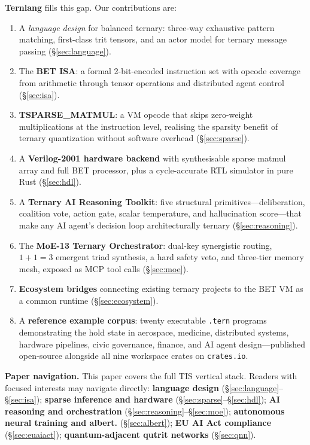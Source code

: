 \documentclass[11pt,a4paper]{article}
\begin{document}
\textbf{Ternlang} fills this gap. Our contributions are:

\begin{enumerate}
  \item A \emph{language design} for balanced ternary: three-way exhaustive
        pattern matching, first-class trit tensors, and an actor model for
        ternary message passing (\S\ref{sec:language}).
  \item The \textbf{BET ISA}: a formal 2-bit-encoded instruction set with
        opcode coverage from arithmetic through tensor operations and
        distributed agent control (\S\ref{sec:isa}).
  \item \textbf{TSPARSE\_MATMUL}: a VM opcode that skips zero-weight
        multiplications at the instruction level, realising the sparsity
        benefit of ternary quantization without software overhead
        (\S\ref{sec:sparse}).
  \item A \textbf{Verilog-2001 hardware backend} with synthesisable sparse
        matmul array and full BET processor, plus a cycle-accurate RTL
        simulator in pure Rust (\S\ref{sec:hdl}).
  \item A \textbf{Ternary AI Reasoning Toolkit}: five structural
        primitives—deliberation, coalition vote, action gate, scalar
        temperature, and hallucination score—that make any AI agent's
        decision loop architecturally ternary (\S\ref{sec:reasoning}).
  \item The \textbf{MoE-13 Ternary Orchestrator}: dual-key synergistic
        routing, $1{+}1{=}3$ emergent triad synthesis, a hard safety veto,
        and three-tier memory mesh, exposed as MCP tool calls
        (\S\ref{sec:moe}).
  \item \textbf{Ecosystem bridges} connecting existing ternary projects to
        the BET VM as a common runtime (\S\ref{sec:ecosystem}).
  \item A \textbf{reference example corpus}: twenty executable
        \texttt{.tern} programs demonstrating the hold state in aerospace,
        medicine, distributed systems, hardware pipelines, civic governance,
        finance, and AI agent design—published open-source alongside all
        nine workspace crates on \texttt{crates.io}.
\end{enumerate}

\noindent\textbf{Paper navigation.}
This paper covers the full TIS vertical stack. Readers with focused interests
may navigate directly: \textbf{language design} (\S\ref{sec:language}--\S\ref{sec:isa});
\textbf{sparse inference and hardware} (\S\ref{sec:sparse}--\S\ref{sec:hdl});
\textbf{AI reasoning and orchestration} (\S\ref{sec:reasoning}--\S\ref{sec:moe});
\textbf{autonomous neural training and albert.} (\S\ref{sec:albert});
\textbf{EU AI Act compliance} (\S\ref{sec:euaiact});
\textbf{quantum-adjacent qutrit networks} (\S\ref{sec:qnn}).
\end{document}
